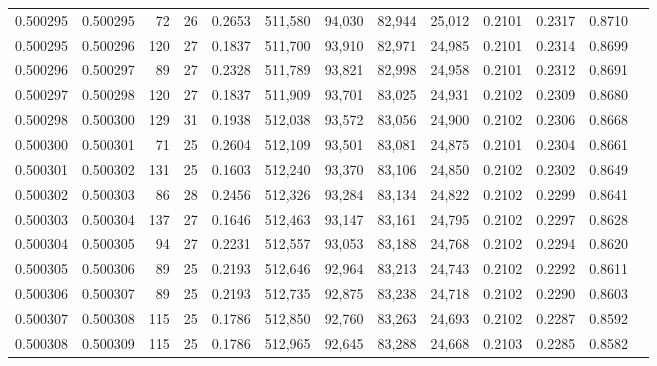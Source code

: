 \begin{tabular}{rrrrrrrrrrrrr}
0.500295 & 0.500295 &  72 &  26 &                                     0.2653 & 511,580 &  94,030 &  82,944 &  25,012 & 0.2101 & 0.2317 & 0.8710 \\
0.500295 & 0.500296 & 120 &  27 &                                     0.1837 & 511,700 &  93,910 &  82,971 &  24,985 & 0.2101 & 0.2314 & 0.8699 \\
0.500296 & 0.500297 &  89 &  27 &                                     0.2328 & 511,789 &  93,821 &  82,998 &  24,958 & 0.2101 & 0.2312 & 0.8691 \\
0.500297 & 0.500298 & 120 &  27 &                                     0.1837 & 511,909 &  93,701 &  83,025 &  24,931 & 0.2102 & 0.2309 & 0.8680 \\
0.500298 & 0.500300 & 129 &  31 &                                     0.1938 & 512,038 &  93,572 &  83,056 &  24,900 & 0.2102 & 0.2306 & 0.8668 \\
0.500300 & 0.500301 &  71 &  25 &                                     0.2604 & 512,109 &  93,501 &  83,081 &  24,875 & 0.2101 & 0.2304 & 0.8661 \\
0.500301 & 0.500302 & 131 &  25 &                                     0.1603 & 512,240 &  93,370 &  83,106 &  24,850 & 0.2102 & 0.2302 & 0.8649 \\
0.500302 & 0.500303 &  86 &  28 &                                     0.2456 & 512,326 &  93,284 &  83,134 &  24,822 & 0.2102 & 0.2299 & 0.8641 \\
0.500303 & 0.500304 & 137 &  27 &                                     0.1646 & 512,463 &  93,147 &  83,161 &  24,795 & 0.2102 & 0.2297 & 0.8628 \\
0.500304 & 0.500305 &  94 &  27 &                                     0.2231 & 512,557 &  93,053 &  83,188 &  24,768 & 0.2102 & 0.2294 & 0.8620 \\
0.500305 & 0.500306 &  89 &  25 &                                     0.2193 & 512,646 &  92,964 &  83,213 &  24,743 & 0.2102 & 0.2292 & 0.8611 \\
0.500306 & 0.500307 &  89 &  25 &                                     0.2193 & 512,735 &  92,875 &  83,238 &  24,718 & 0.2102 & 0.2290 & 0.8603 \\
0.500307 & 0.500308 & 115 &  25 &                                     0.1786 & 512,850 &  92,760 &  83,263 &  24,693 & 0.2102 & 0.2287 & 0.8592 \\
0.500308 & 0.500309 & 115 &  25 &                                     0.1786 & 512,965 &  92,645 &  83,288 &  24,668 & 0.2103 & 0.2285 & 0.8582 \\

\end{tabular}
